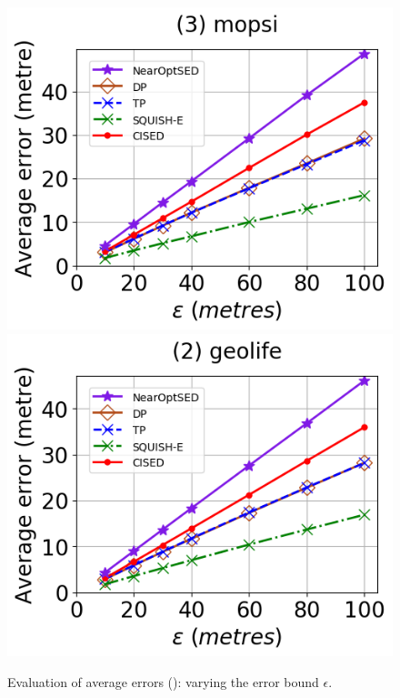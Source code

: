 \begin{figure}[tb!]
	\includegraphics[scale=0.315]{Figures/Exp-SED-error-epsilon-mopsi.png}		\hspace{1ex}
	\includegraphics[scale=0.315]{Figures/Exp-SED-error-epsilon-geolife.png}
	\vspace{-2.5ex}
	\caption{\small Evaluation of average errors (\sed): varying the error bound $\epsilon$.}
	\label{fig:ae-sed}
	\vspace{-3ex}
\end{figure}

